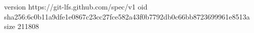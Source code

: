 version https://git-lfs.github.com/spec/v1
oid sha256:6c0b11a9dfe1e0867c23cc27fce582a43f0b7792db0c66bb8723699961e8513a
size 211808
